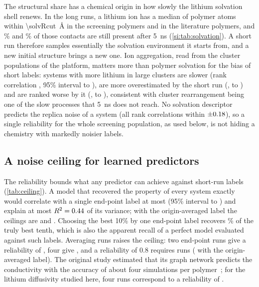 \documentclass[journal=jcisd8,manuscript=article,email=true]{achemso}
\begin{document}
The structural share has a chemical origin in how slowly the lithium solvation shell renews. In
the \solvN{} long runs, a lithium ion has a median of \solvCnScreen{} polymer atoms within
\SI{\solvRcut}{\angstrom} in the screening polymers and \solvCnLit{} in the literature polymers,
and \solvPersFiveScreen\% and \solvPersFiveLit\% of those contacts are still present after
\SI{5}{\nano\second} (\cref{si:tab:solvation}). A short run therefore samples essentially the
solvation environment it starts from, and a new initial structure brings a new one. Ion
aggregation, read from the cluster populations of the platform, matters more than polymer
solvation for the bias of short labels: systems with more lithium in large clusters are slower
(rank correlation \solvAggrD, 95\% interval \solvAggrDLo{} to \solvAggrDHi), are more overestimated
by the short run (\solvAggrOver, \solvAggrOverLo{} to \solvAggrOverHi) and are ranked worse by it
(\solvAggrRank, \solvAggrRankLo{} to \solvAggrRankHi), consistent with cluster rearrangement being
one of the slow processes that \SI{5}{\nano\second} does not reach. No solvation descriptor
predicts the replica noise of a system (all rank correlations within $\pm0.18$), so a
single reliability for the whole screening population, as used below, is not hiding a chemistry
with markedly noisier labels.

\subsection{A noise ceiling for learned predictors}\label{sec:res-ceiling}
The reliability bounds what any predictor can achieve against short-run labels
(\cref{tab:ceiling}). A model that recovered the property of every system exactly would correlate
with a single end-point label at most \techoEndCorr{} (95\% interval
\techoEndCorrLo{} to \techoEndCorrHi) and explain at most $R^2=0.44$ of its variance; with the
origin-averaged label the ceilings are \techoAvgCorr{} and \techoAvgRTwo. Choosing the best 10\% by
one end-point label recovers \techoEndRecallOneTopTen\% of the truly best tenth, which is also the
apparent recall of a perfect model evaluated against such labels. Averaging runs raises the ceiling:
two end-point runs give a reliability of \techoEndRelTwo, four give \techoEndRelFour, and a
reliability of 0.8 requires \techoEndRepForEight{} runs (\techoAvgRepForEight{} with the
origin-averaged label). The original study estimated that its graph network predicts the
conductivity with the accuracy of about four simulations per polymer~\cite{Xie2022Accelerating};
for the lithium diffusivity studied here, four runs correspond to a reliability of
\techoEndRelFour.
\end{document}
